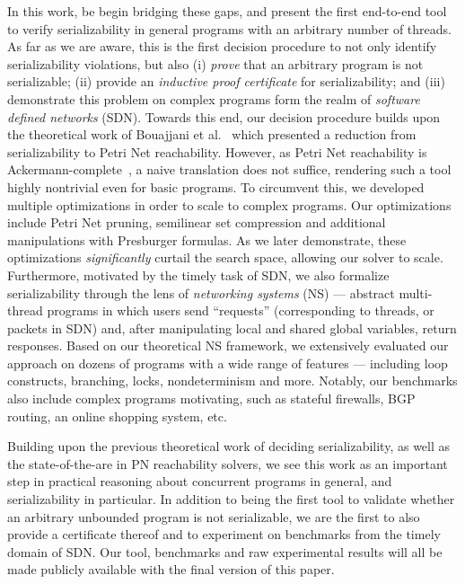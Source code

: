 In this work, be begin bridging these gaps, and present the first end-to-end tool to verify serializability in general programs with an arbitrary number of threads. 
As far as we are aware, this is the first decision procedure to not only identify serializability violations, but also (i) \textit{prove} that an arbitrary program is not serializable; (ii) provide an \textit{inductive proof certificate} for serializability; and (iii) demonstrate this problem on complex programs form the realm of \textit{software defined networks} (SDN).
%
Towards this end, our decision procedure builds upon the theoretical work of Bouajjani et al.~\cite{BoEmEnHa13} which presented a reduction from serializability to Petri Net reachability.  However, as Petri Net reachability is Ackermann-complete~\cite{CzWo22}, a naive translation does not suffice, rendering such a tool  highly nontrivial even for basic programs. To circumvent this, we developed multiple optimizations in order to scale to complex programs. 
Our optimizations include Petri Net pruning, semilinear set compression and additional manipulations with Presburger formulas.
As we later demonstrate, these optimizations \textit{significantly} curtail the search space, allowing our solver to scale.
%
Furthermore, motivated by the timely task of SDN, 
we also formalize serializability through the lens of \textit{networking systems} (NS) --- abstract multi-thread programs in which users send ``requests'' (corresponding to threads, or packets in SDN) and, after manipulating local and shared global variables, return responses.
Based on our theoretical NS framework, we extensively evaluated our approach on dozens of programs with a wide range of features --- including loop constructs, branching, locks, nondeterminism and more. Notably, our benchmarks also include complex programs motivating, such as stateful firewalls, BGP routing, an online shopping system, etc.
  

Building upon the previous theoretical work of deciding serializability, as well as the state-of-the-are in PN reachability solvers, we see this work as an important step in practical reasoning about concurrent programs in general, and serializability in particular.
In addition to being the first tool to validate whether an arbitrary unbounded program is not serializable, we are the first to also provide a certificate thereof and to experiment on benchmarks from the timely domain of SDN.
Our tool, benchmarks and raw experimental results will all be made publicly available with the final version of this paper.

